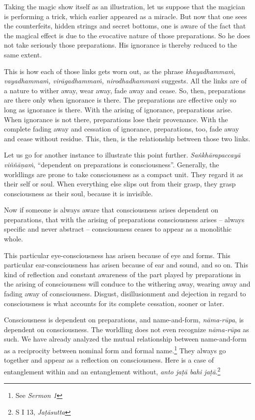 Taking the magic show itself as an illustration, let us suppose that the magician is performing a trick, which earlier appeared as a miracle. But now that one sees the counterfeits, hidden strings and secret bottoms, one is aware of the fact that the magical effect is due to the evocative nature of those preparations. So he does not take seriously those preparations. His ignorance is thereby reduced to the same extent.

This is how each of those links gets worn out, as the phrase \emph{khayadhammaṁ, vayadhammaṁ, virāgadhammaṁ, nirodhadhammaṁ} suggests. All the links are of a nature to wither away, wear away, fade away and cease. So, then, preparations are there only when ignorance is there. The preparations are effective only so long as ignorance is there. With the arising of ignorance, preparations arise. When ignorance is not there, preparations lose their provenance. With the complete fading away and cessation of ignorance, preparations, too, fade away and cease without residue. This, then, is the relationship between those two links.

Let us go for another instance to illustrate this point further. \emph{Saṅkhārapaccayā viññāṇaṁ}, ``dependent on preparations is consciousness''. Generally, the worldlings are prone to take consciousness as a compact unit. They regard it as their self or soul. When everything else slips out from their grasp, they grasp consciousness as their soul, because it is invisible.

Now if someone is always aware that consciousness arises dependent on preparations, that with the arising of preparations consciousness arises -- always specific and never abstract -- consciousness ceases to appear as a monolithic whole.

This particular eye-consciousness has arisen because of eye and forms. This particular ear-consciousness has arisen because of ear and sound, and so on. This kind of reflection and constant awareness of the part played by preparations in the arising of consciousness will conduce to the withering away, wearing away and fading away of consciousness. Disgust, disillusionment and dejection in regard to consciousness is what accounts for its complete cessation, sooner or later.

Consciousness is dependent on preparations, and name-and-form, \emph{nāma-rūpa}, is dependent on consciousness. The worldling does not even recognize \emph{nāma-rūpa} as such. We have already analyzed the mutual relationship between name-and-form as a reciprocity between nominal form and formal name.\footnote{See \emph{Sermon 1}} They always go together and appear as a reflection on consciousness. Here is a case of entanglement within and an entanglement without, \emph{anto jaṭā bahi jaṭā}.\footnote{S I 13, \emph{Jaṭāsutta}}


